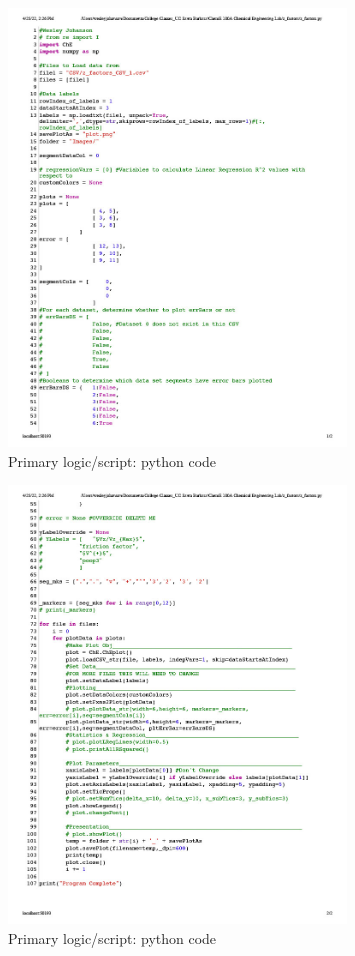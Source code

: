 \documentclass{article}
\begin{document}
\begin{figure}[H] \centering
\includegraphics[width=0.8\textwidth]{code/z_factors_py1024_1.jpg}
\caption{\label{fig1}Primary logic/script: python code}\end{figure}


\begin{figure}[H] \centering
\includegraphics[width=0.8\textwidth]{code/z_factors_py1024_2.jpg}
\caption{\label{fig1}Primary logic/script: python code}\end{figure}
\end{document}
